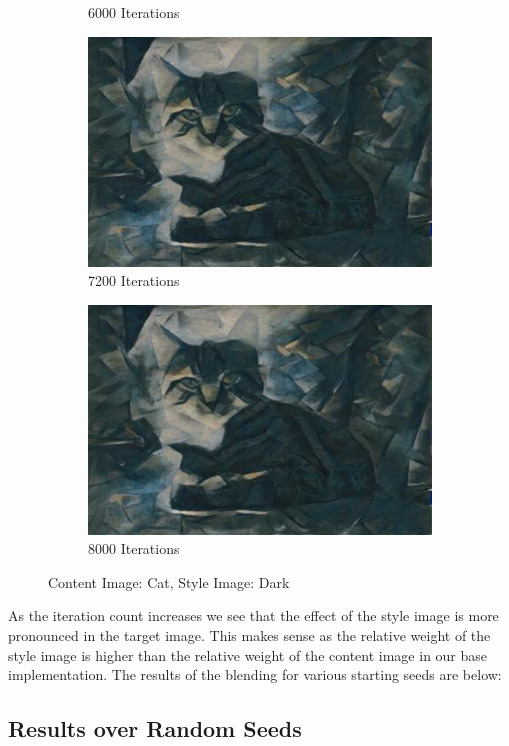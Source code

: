 \documentclass{article}
\begin{document}
\begin{figure}[H]
\begin{subfigure}{.5\textwidth}
  \caption{6000 Iterations}
  \label{fig:sfig6}
\end{subfigure}
\begin{subfigure}{.5\textwidth}
  \centering
  \includegraphics[width=.8\linewidth]{cat_dark_7200}
  \caption{7200 Iterations}
  \label{fig:sfig7}
\end{subfigure}
\begin{subfigure}{.5\textwidth}
  \centering
  \includegraphics[width=.8\linewidth]{cat_dark_8000}
  \caption{8000 Iterations}
  \label{fig:sfig8}
\end{subfigure}
\caption{Content Image: Cat, Style Image: Dark}
\label{fig:fig}
\end{figure}

\noindent As the iteration count increases we see that the effect of the style image is more pronounced in the target image. This makes sense as the relative weight of the style image is higher than the relative weight of the content image in our base implementation. The results of the blending for various starting seeds are below:

\subsection{Results over Random Seeds}
\end{document}
